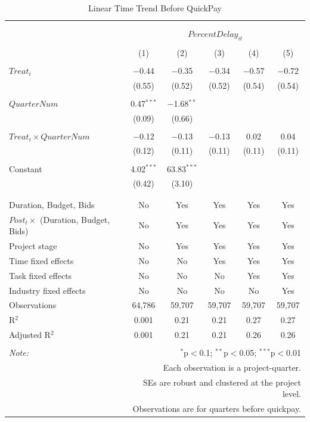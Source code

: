 \documentclass[
]{article}
\begin{document}
\begin{table}[H] \centering 
  \caption{Linear Time Trend Before QuickPay} 
  \label{} 
\small 
\begin{tabular}{@{\extracolsep{-2pt}}lccccc} 
\\[-1.8ex]\hline 
\hline \\[-1.8ex] 
\\[-1.8ex] & \multicolumn{5}{c}{$PercentDelay_{it}$} \\ 
\\[-1.8ex] & (1) & (2) & (3) & (4) & (5)\\ 
\hline \\[-1.8ex] 
 $Treat_i$ & $-$0.44 & $-$0.35 & $-$0.34 & $-$0.57 & $-$0.72 \\ 
  & (0.55) & (0.52) & (0.52) & (0.54) & (0.54) \\ 
  & & & & & \\ 
 $QuarterNum$ & 0.47$^{***}$ & $-$1.68$^{**}$ &  &  &  \\ 
  & (0.09) & (0.66) &  &  &  \\ 
  & & & & & \\ 
 $Treat_i \times QuarterNum$ & $-$0.12 & $-$0.13 & $-$0.13 & 0.02 & 0.04 \\ 
  & (0.12) & (0.11) & (0.11) & (0.11) & (0.11) \\ 
  & & & & & \\ 
 Constant & 4.02$^{***}$ & 63.83$^{***}$ &  &  &  \\ 
  & (0.42) & (3.10) &  &  &  \\ 
  & & & & & \\ 
\hline \\[-1.8ex] 
Duration, Budget, Bids & No & Yes & Yes & Yes & Yes \\ 
$Post_t \times$  (Duration, Budget, Bids) & No & Yes & Yes & Yes & Yes \\ 
Project stage & No & Yes & Yes & Yes & Yes \\ 
Time fixed effects & No & No & Yes & Yes & Yes \\ 
Task fixed effects & No & No & No & Yes & Yes \\ 
Industry fixed effects & No & No & No & No & Yes \\ 
Observations & 64,786 & 59,707 & 59,707 & 59,707 & 59,707 \\ 
R$^{2}$ & 0.001 & 0.21 & 0.21 & 0.27 & 0.27 \\ 
Adjusted R$^{2}$ & 0.001 & 0.21 & 0.21 & 0.26 & 0.26 \\ 
\hline 
\hline \\[-1.8ex] 
\textit{Note:}  & \multicolumn{5}{r}{$^{*}$p$<$0.1; $^{**}$p$<$0.05; $^{***}$p$<$0.01} \\ 
 & \multicolumn{5}{r}{Each observation is a project-quarter.} \\ 
 & \multicolumn{5}{r}{SEs are robust and clustered at the project level.} \\ 
 & \multicolumn{5}{r}{Observations are for quarters before quickpay.} \\ 
\end{tabular} 
\end{table}
\end{document}

